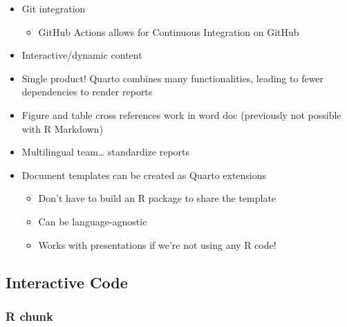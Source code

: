 \documentclass[
  letterpaper,
  DIV=11,
  numbers=noendperiod]{scrartcl}
\providecommand{\tightlist}{%
  \setlength{\itemsep}{0pt}\setlength{\parskip}{0pt}}\usepackage{longtable,booktabs,array}
\begin{document}
\begin{itemize}
\tightlist
\item
  Git integration

  \begin{itemize}
  \tightlist
  \item
    GitHub Actions allows for Continuous Integration on GitHub
  \end{itemize}
\item
  Interactive/dynamic content
\item
  Single product! Quarto combines many functionalities, leading to fewer
  dependencies to render reports
\item
  Figure and table cross references work in word doc (previously not
  possible with R Markdown)
\item
  Multilingual team\ldots{} {standardize reports}
\item
  Document templates can be created as Quarto extensions
  {}\\

  \begin{itemize}
  \tightlist
  \item
    Don't have to build an R package to share the template
  \item
    Can be language-agnostic
  \item
    Works with presentations if we're not using any R code!
  \end{itemize}
\end{itemize}

\hypertarget{interactive-code}{%
\subsection{Interactive Code}\label{interactive-code}}

\subsubsection{R chunk}
\end{document}
